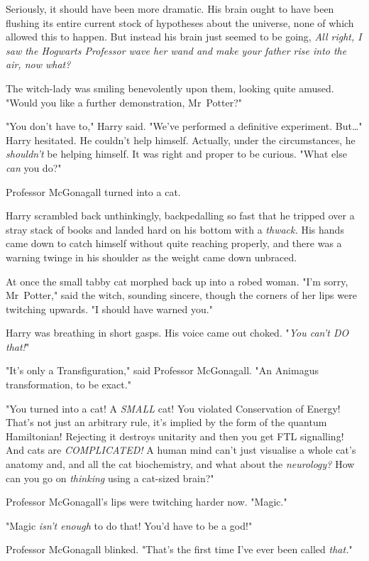 Seriously, it should have been more dramatic. His brain ought to have been
flushing its entire current stock of hypotheses about the universe, none of
which allowed this to happen. But instead his brain just seemed to be going,
\emph{All right, I saw the Hogwarts Professor wave her wand and make your
father rise into the air, now what?}

The witch-lady was smiling benevolently upon them, looking quite amused. "Would
you like a further demonstration, Mr~Potter?"

"You don't have to," Harry said. "We've performed a definitive experiment.
But…" Harry hesitated. He couldn't help himself. Actually, under the
circumstances, he \emph{shouldn't} be helping himself. It was right and proper
to be curious. "What else \emph{can} you do?"

Professor McGonagall turned into a cat.

Harry scrambled back unthinkingly, backpedalling so fast that he tripped over a
stray stack of books and landed hard on his bottom with a \emph{thwack.} His
hands came down to catch himself without quite reaching properly, and there was
a warning twinge in his shoulder as the weight came down unbraced.

At once the small tabby cat morphed back up into a robed woman. "I'm sorry,
Mr~Potter," said the witch, sounding sincere, though the corners of her lips
were twitching upwards. "I should have warned you."

Harry was breathing in short gasps. His voice came out choked. "\emph{You can't
DO that!}"

"It's only a Transfiguration," said Professor McGonagall. "An Animagus
transformation, to be exact."

"You turned into a cat! A \emph{SMALL} cat! You violated Conservation of
Energy! That's not just an arbitrary rule, it's implied by the form of the
quantum Hamiltonian! Rejecting it destroys unitarity and then you get FTL
signalling! And cats are \emph{COMPLICATED!} A human mind can't just visualise
a whole cat's anatomy and, and all the cat biochemistry, and what about the
\emph{neurology?} How can you go on \emph{thinking} using a cat-sized brain?"

Professor McGonagall's lips were twitching harder now. "Magic."

"Magic \emph{isn't enough} to do that! You'd have to be a god!"

Professor McGonagall blinked. "That's the first time I've ever been called
\emph{that.}"

